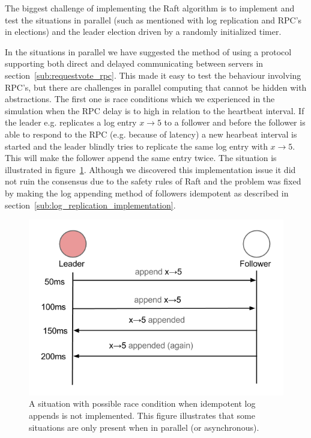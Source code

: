 The biggest challenge of implementing the Raft algorithm is to implement and test the situations in parallel (such as mentioned with log replication and RPC's in elections) and the leader election driven by a randomly initialized timer.

In the situations in parallel we have suggested the method of using a protocol supporting both direct and delayed communicating between servers in section~\ref{sub:requestvote_rpc}. This made it easy to test the behaviour involving RPC's, but there are challenges in parallel computing that cannot be hidden with abstractions. The first one is race conditions which we experienced in the simulation when the RPC delay is to high in relation to the heartbeat interval. If the leader e.g. replicates a log entry $x\rightarrow5$ to a follower and before the follower is able to respond to the RPC (e.g. because of latency) a new hearbeat interval is started and the leader blindly tries to replicate the same log entry with $x\rightarrow5$. This will make the follower append the same entry twice. The situation is illustrated in figure~\ref{fig:replication_race_condition}. Although we discovered this implementation issue it did not ruin the consensus due to the safety rules of Raft and the problem was fixed by making the log appending method of followers idempotent as described in section~\ref{sub:log_replication_implementation}.

\begin{figure}
\centering
\includegraphics[scale = 0.5]{figures/replication_race_condition.png}
\caption{A situation with possible race condition when idempotent log appends is not implemented. This figure illustrates that some situations are only present when in parallel (or asynchronous).}
\label{fig:replication_race_condition}
\end{figure}

